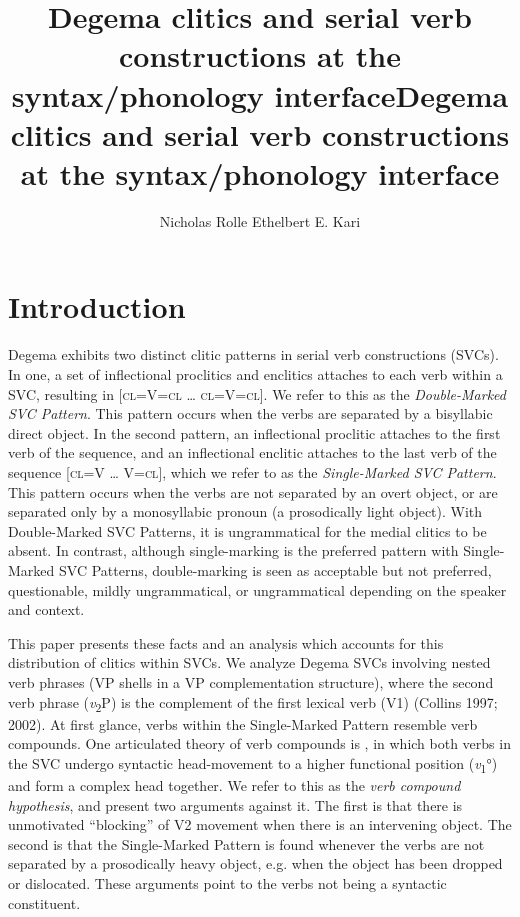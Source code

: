 \documentclass[output=paper]{langsci/langscibook}
\title{Degema clitics and serial verb constructions at the syntax/phonology interface}
\author{%
 Nicholas Rolle\affiliation{University of California, Berkeley}\lastand 
 Ethelbert E. Kari \affiliation{University of Botswana / University of Port Harcourt}
}
\begin{document}
\title{Degema clitics and serial verb constructions at the syntax/phonology interface}
 



 


\section{Introduction}

Degema exhibits two distinct clitic patterns in serial verb constructions (SVCs). In one, a set of inflectional proclitics and enclitics attaches to each verb within a SVC, resulting in [\textsc{cl=}V\textsc{=cl} … \textsc{cl=}V\textsc{=cl}]. We refer to this as the \textit{Double-Marked SVC Pattern}. This pattern occurs when the verbs are separated by a bisyllabic direct object. In the second pattern, an inflectional proclitic attaches to the first verb of the sequence, and an inflectional enclitic attaches to the last verb of the sequence [\textsc{cl=}V … V\textsc{=cl}], which we refer to as the \textit{Single-Marked SVC Pattern}. This pattern occurs when the verbs are not separated by an overt object, or are separated only by a monosyllabic pronoun (a prosodically light object). With Double-Marked SVC Patterns, it is ungrammatical for the medial clitics to be absent. In contrast, although single-marking is the preferred pattern with Single-Marked SVC Patterns, double-marking is seen as acceptable but not preferred, questionable, mildly ungrammatical, or ungrammatical depending on the speaker and context. 

This paper presents these facts and an analysis which accounts for this distribution of clitics within SVCs. We analyze Degema SVCs involving nested verb phrases (VP shells in a VP complementation structure), where the second verb phrase (\textit{v}\textsubscript{2}P) is the complement of the first lexical verb (V1) (Collins 1997; 2002). At first glance, verbs within the Single-Marked Pattern resemble verb compounds. One articulated theory of verb compounds is \citet{Collins2002}, in which both verbs in the SVC undergo syntactic head-movement to a higher functional position (\textit{v}\textsubscript{1}°) and form a complex head together. We refer to this as the \textit{verb compound hypothesis}, and present two arguments against it. The first is that there is unmotivated “blocking” of V2 movement when there is an intervening object. The second is that the Single-Marked Pattern is found whenever the verbs are not separated by a prosodically heavy object, e.g. when the object has been dropped or dislocated. These arguments point to the verbs not being a syntactic constituent. 
\end{document}
